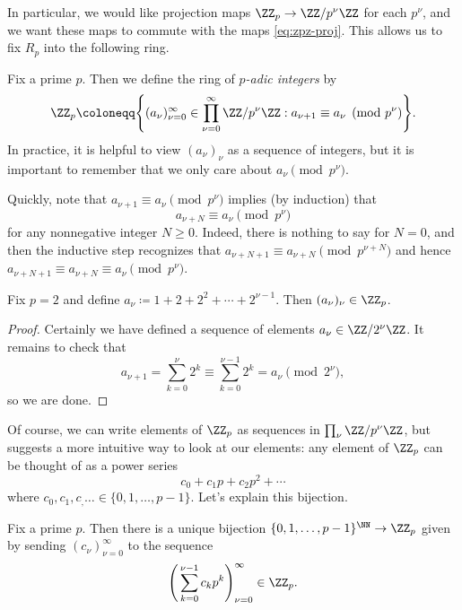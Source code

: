 \documentclass[../notes.tex]{subfiles}
\begin{document}
In particular, we would like projection maps $\ZZ_p\to\ZZ/p^\nu\ZZ$ for each $p^\nu$, and we want these maps to commute with the maps \eqref{eq:zpz-proj}. This allows us to fix $R_p$ into the following ring.
\begin{defihelper} 
	Fix a prime $p$. Then we define the ring of \textit{$p$-adic integers} by
	\[\ZZ_p\coloneqq\Bigg\{(a_\nu)_{\nu=0}^\infty\in\prod_{\nu=0}^\infty\ZZ/p^\nu\ZZ:a_{\nu+1}\equiv a_\nu\pmod{p^\nu}\Bigg\}.\]
	In practice, it is helpful to view $(a_\nu)_\nu$ as a sequence of integers, but it is important to remember that we only care about $a_\nu\pmod{p^\nu}$.
\end{defihelper}
\begin{remark} \label{rem:upgrade-zp-equiv}
	Quickly, note that $a_{\nu+1}\equiv a_\nu\pmod{p^\nu}$ implies (by induction) that
	\[a_{\nu+N}\equiv a_\nu\pmod{p^\nu}\]
	for any nonnegative integer $N\ge0$. Indeed, there is nothing to say for $N=0$, and then the inductive step recognizes that $a_{\nu+N+1}\equiv a_{\nu+N}\pmod{p^{\nu+N}}$ and hence $a_{\nu+N+1}\equiv a_{\nu+N}\equiv a_\nu\pmod{p^\nu}$.
\end{remark}
\begin{example} \label{ex:power-series-z2}
	Fix $p=2$ and define $a_\nu\coloneqq1+2+2^2+\cdots+2^{\nu-1}$. Then $(a_\nu)_\nu\in\ZZ_p$.
\end{example}
\begin{proof}
	Certainly we have defined a sequence of elements $a_\nu\in\ZZ/2^\nu\ZZ$. It remains to check that
	\[a_{\nu+1}=\sum_{k=0}^\nu2^k\equiv\sum_{k=0}^{\nu-1}2^k=a_\nu\pmod{2^\nu},\]
	so we are done.
\end{proof}
Of course, we can write elements of $\ZZ_p$ as sequences in $\prod_\nu\ZZ/p^\nu\ZZ$, but  suggests a more intuitive way to look at our elements: any element of $\ZZ_p$ can be thought of as a power series
\[c_0+c_1p+c_2p^2+\cdots\]
where $c_0,c_1,c_,\ldots\in\{0,1,\ldots,p-1\}$. Let's explain this bijection.
\begin{proposition} \label{prop:p-adic-power-series}
	Fix a prime $p$. Then there is a unique bijection $\{0,1,\ldots,p-1\}^\NN\to\ZZ_p$ given by sending $(c_\nu)_{\nu=0}^\infty$ to the sequence
	\[\Bigg(\sum_{k=0}^{\nu-1}c_kp^k\Bigg)_{\nu=0}^\infty\in\ZZ_p.\]
\end{proposition}
\end{document}

